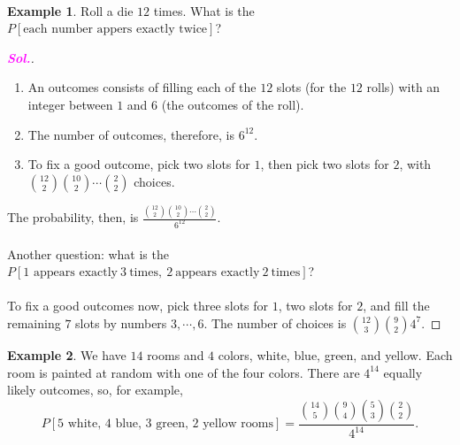 \documentclass[12pt,a4paper]{article}
\theoremstyle{definition}
\newtheorem{example}{Example}[section]
\theoremstyle{definition}
\theoremstyle{definition}
\theoremstyle{definition}
\theoremstyle{remark}
\theoremstyle{definition}
\newcommand{\dispsty}{\displaystyle}
\newcommand{\sol}{\textcolor{magenta}{\bf \textit{Sol.}}\quad}
\begin{document}
\
\begin{example}
	Roll a die $12$ times. What is the $P[\text{each number appers exactly twice}]$?
	\begin{proof}[\sol]\
		\begin{enumerate}
			\item An outcomes consists of filling each of the $12$ slots (for the $12$ rolls) with an integer between $1$ and $6$ (the outcomes of the roll).
			\item The number of outcomes, therefore, is $6^12$.
			\item To fix a good outcome, pick two slots for $1$, then pick two slots for $2$, with $\dispsty\binom{12}{2}\binom{10}{2}\cdots\binom{2}{2}$ choices.
		\end{enumerate} The probability, then, is $\dispsty\frac{\binom{12}{2}\binom{10}{2}\cdots\binom{2}{2}}{6^{12}}$.\\
	\\
	Another question: what is the $P[1\text{ appears exactly}\ 3\ \text{times},\ 2\ \text{appears exactly}\ 2\ \text{times} ]$?\\
	\\ To fix a good outcomes now, pick three slots for $1$, two slots for $2$, and fill the remaining $7$ slots by numbers $3,\cdots,6$. The number of choices is $\binom{12}{3}\binom{9}{2}4^7$.
	\end{proof}
\end{example}
\newpage
\begin{example}
	We have $14$ rooms and $4$ colors, white, blue, green, and yellow. Each room is painted at random with one of the four colors. There are $4^{14}$ equally likely outcomes, so, for example, \[
	P[\text{5 white, 4 blue, 3 green, 2 yellow rooms}]=\frac{\binom{14}{5}\binom{9}{4}\binom{5}{3}\binom{2}{2}}{4^{14}}.
	\]
\end{example}
\end{document}
